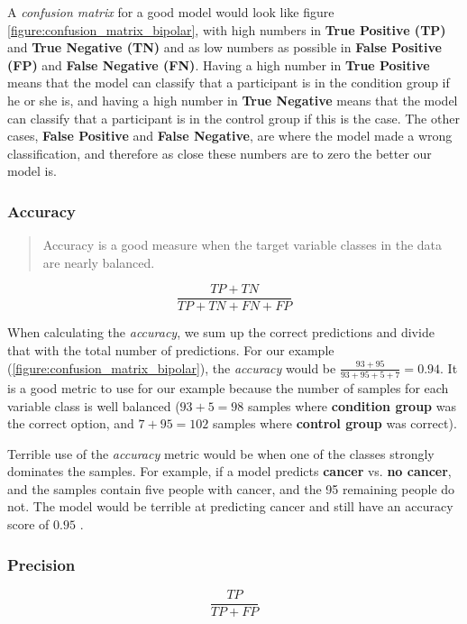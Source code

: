 A \textit{confusion matrix} for a good model would look like figure \ref{figure:confusion_matrix_bipolar}, with high numbers in \textbf{True Positive (TP)} and \textbf{True Negative (TN)} and as low numbers as possible in \textbf{False Positive (FP)} and \textbf{False Negative (FN)}. Having a high number in \textbf{True Positive} means that the model can classify that a participant is in the condition group if he or she is, and having a high number in \textbf{True Negative} means that the model can classify that a participant is in the control group if this is the case. The other cases, \textbf{False Positive} and \textbf{False Negative}, are where the model made a wrong classification, and therefore as close these numbers are to zero the better our model is.

\newpage

\subsubsection{Accuracy}

\blockquote[\cite{ml_metrics}]{Accuracy is a good measure when the target variable classes in the data are nearly balanced.}

\[ \frac{TP + TN}{TP + TN + FN + FP} \]

When calculating the \textit{accuracy}, we sum up the correct predictions and divide that with the total number of predictions. For our example (\ref{figure:confusion_matrix_bipolar}), the \textit{accuracy} would be $ \frac{93 + 95}{93 + 95 + 5 + 7} = 0.94 $. It is a good metric to use for our example because the number of samples for each variable class is well balanced ($ 93+5=98 $ samples where \textbf{condition group} was the correct option, and $ 7+95=102 $ samples where \textbf{control group} was correct).

Terrible use of the \textit{accuracy} metric would be when one of the classes strongly dominates the samples. For example, if a model predicts \textbf{cancer} vs. \textbf{no cancer}, and the samples contain five people with cancer, and the 95 remaining people do not. The model would be terrible at predicting cancer and still have an accuracy score of $ 0.95 $ \cite{ml_metrics}.

\newpage

\subsubsection{Precision} 

\[ \frac{TP}{TP + FP} \]

